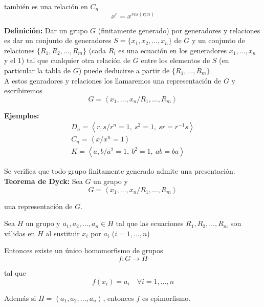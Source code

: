 \documentclass{article}
\begin{document}
también es una relación en $C_n$
\begin{equation*}
x^r=x^{res(r;n)}
\end{equation*}

\textbf{Definición:} Dar un grupo $G$ (finitamente generado) por generadores y relaciones es dar un conjunto de generadores $S=\{x_1,x_2,\ldots,x_n\}$ de $G$ y un conjunto de relaciones $\{R_1,R_2,\ldots,R_m\}$ (cada $R_i$ es una ecuación en los generadores $x_1,\ldots,x_n$ y el 1) tal que cualquier otra relación de $G$ entre los elementos de $S$ (en particular la tabla de $G$) puede deducirse a partir de $\{R_1,\ldots,R_m\}$.\\

A estos genradores y relaciones los llamaremos una representación de $G$ y escribiremos
\begin{equation*}
G=\left\langle x_1,\ldots,x_n/R_1,\ldots,R_m\right\rangle
\end{equation*}

\textbf{Ejemplos:}
\begin{gather*}
D_n=\left\langle r,s/r^n=1,\:s^2=1,\:sr=r^{-1}s\right\rangle \\
C_n=\left\langle x/x^n=1\right\rangle \\
K=\left\langle a,b/a^2=1,\:b^2=1,\:ab=ba\right\rangle
\end{gather*}

Se verifica que todo grupo finitamente generado admite una presentación. \\

\textbf{Teorema de Dyck:} Sea $G$ un grupo y
\begin{equation*}
G=\left\langle x_1,\ldots,x_n/R_1,\ldots,R_m\right\rangle
\end{equation*}

una representación de $G$.

Sea $H$ un grupo y $a_1,a_2,\ldots,a_n\in H$ tal que las ecuaciones $R_1,R_2,\ldots,R_m$ son válidas en $H$ al sustituir $x_i$ por $a_i$ ($i=1,\ldots,n$)

Entonces existe un único homomorfismo de grupos
\begin{equation*}
f:G\longrightarrow H
\end{equation*}

tal que 
\begin{equation*}
f(x_i)=a_i\quad \forall i=1,\ldots,n
\end{equation*}

Además si $H=\left\langle a_1,a_2,\ldots,a_n\right\rangle$, entonces $f$ es epimorfismo. \\
\end{document}

